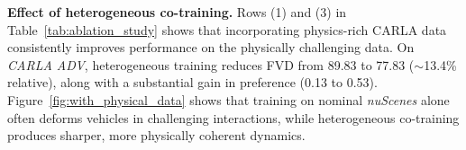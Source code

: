\documentclass[runningheads]{llncs}
\begin{document}
\noindent\textbf{Effect of heterogeneous co-training.}
Rows (1) and (3) in Table~\ref{tab:ablation_study} shows that incorporating physics-rich CARLA data consistently improves performance on the physically challenging data. On \textit{CARLA ADV}, heterogeneous training reduces FVD from 89.83 to 77.83 ($\sim$13.4\% relative), along with a substantial gain in preference (0.13 to 0.53). Figure~\ref{fig:with_physical_data} shows that training on nominal \textit{nuScenes} alone often deforms vehicles in challenging interactions, while heterogeneous co-training produces sharper, more physically coherent dynamics.



  


  
\end{document}
